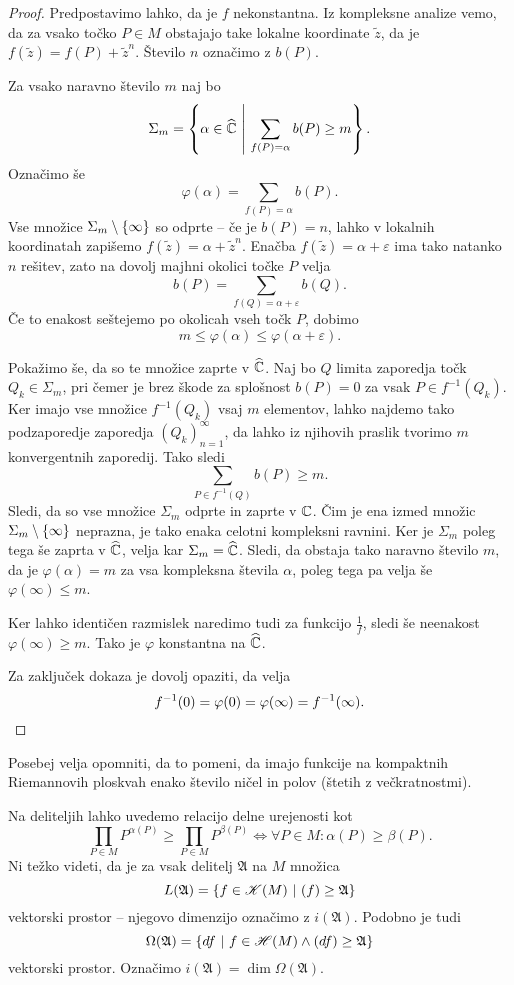 \begin{proof}
Predpostavimo lahko, da je $f$ nekonstantna. Iz kompleksne analize
vemo, da za vsako točko $P \in M$ obstajajo take lokalne
koordinate $\tilde{z}$, da je $f(\tilde{z}) = f(P) + \tilde{z}^n$.
Število $n$ označimo z $b(P)$.

Za vsako naravno število $m$ naj bo
\[
\Sigma_m = \left\{\alpha \in \widehat{\mathbb{C}}~\middle\vert~\sum_{f(P)=\alpha} b(P) \geq m\right\}.
\]
Označimo še
\[
\varphi(\alpha) = \sum_{f(P)=\alpha} b(P).
\]
Vse množice $\Sigma_m \setminus \left\{\infty\right\}$ so odprte -- če je
$b(P) = n$, lahko v lokalnih koordinatah zapišemo
$f(\tilde{z}) = \alpha + \tilde{z}^n$. Enačba
$f(\tilde{z}) = \alpha + \varepsilon$ ima tako natanko $n$
rešitev, zato na dovolj majhni okolici točke $P$ velja
\[
b(P) = \sum_{f(Q) = \alpha + \varepsilon} b(Q).
\]
Če to enakost seštejemo po okolicah vseh točk $P$, dobimo
\[
m \leq \varphi(\alpha) \leq \varphi(\alpha + \varepsilon).
\]

Pokažimo še, da so te množice zaprte v $\widehat{\mathbb{C}}$. Naj bo $Q$ limita
zaporedja točk $Q_k \in \Sigma_m$, pri čemer je brez škode za
splošnost $b(P) = 0$ za vsak $P \in f^{-1}(Q_k)$. Ker imajo vse
množice $f^{-1}(Q_k)$ vsaj $m$ elementov, lahko najdemo tako
podzaporedje zaporedja $(Q_k)_{n=1}^\infty$, da lahko iz njihovih
praslik tvorimo $m$ konvergentnih zaporedij. Tako sledi
\[
\sum_{P \in f^{-1}(Q)} b(P) \geq m.
\]
Sledi, da so vse množice $\Sigma_m$ odprte in zaprte v $\mathbb{C}$. Čim
je ena izmed množic $\Sigma_m \setminus \left\{\infty\right\}$ neprazna,
je tako enaka celotni kompleksni ravnini. Ker je $\Sigma_m$ poleg
tega še zaprta v $\widehat{\mathbb{C}}$, velja kar $\Sigma_m = \widehat{\mathbb{C}}$. Sledi, da
obstaja tako naravno število $m$, da je $\varphi(\alpha) = m$ za
vsa kompleksna števila $\alpha$, poleg tega pa velja še
$\varphi(\infty) \leq m$.

Ker lahko identičen razmislek naredimo tudi za funkcijo
$\frac{1}{f}$, sledi še neenakost $\varphi(\infty) \geq m$. Tako
je $\varphi$ konstantna na $\widehat{\mathbb{C}}$.

Za zaključek dokaza je dovolj opaziti, da velja
\[
f^{-1}(0) = \varphi(0) = \varphi(\infty) = f^{-1}(\infty).
\qedhere
\]
\end{proof}

Posebej velja opomniti, da to pomeni, da imajo funkcije na
kompaktnih Riemannovih ploskvah enako število ničel in polov
(štetih z večkratnostmi).

Na deliteljih lahko uvedemo relacijo delne urejenosti kot
\[
\prod_{P \in M} P^{\alpha(P)} \geq \prod_{P \in M} P^{\beta(P)}
\iff
\forall P \in M \colon \alpha(P) \geq \beta(P).
\]
Ni težko videti, da je za vsak delitelj $\mathfrak{A}$ na $M$
množica
\[
L(\mathfrak{A}) =
\left\{f \in \mathscr{K}(M)~\middle\vert~(f) \geq \mathfrak{A}\right\}
\]
vektorski prostor -- njegovo dimenzijo označimo z
$i(\mathfrak{A})$. Podobno je tudi
\[
\Omega(\mathfrak{A}) =
\left\{df~\middle\vert~f \in \mathscr{H}(M) \land (df) \geq \mathfrak{A}\right\}
\]
vektorski prostor. Označimo
$i(\mathfrak{A}) = \dim \Omega(\mathfrak{A})$.

